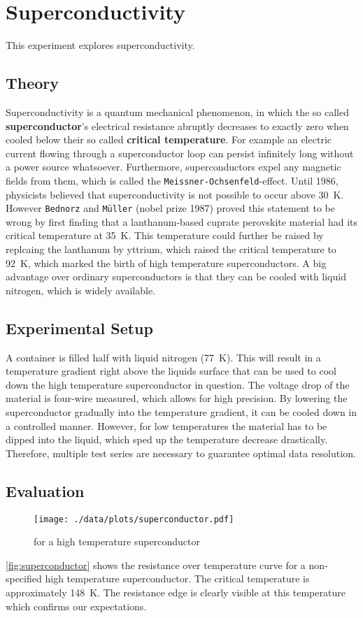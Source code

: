 \chapter{Superconductivity}
This experiment explores superconductivity.

\section{Theory}
Superconductivity is a quantum mechanical phenomenon, in which the so called \textbf{superconductor}'s electrical resistance abruptly decreases to exactly zero when cooled below their so called \textbf{critical temperature}.
For example an electric current flowing through a superconductor loop can persist infinitely long without a power source whatsoever.
Furthermore, superconductors expel any magnetic fields from them, which is called the \texttt{Meissner-Ochsenfeld}-effect.
Until 1986, physicists believed that superconductivity is not possible to occur above \SI{30}{\kelvin}.
However \texttt{Bednorz} and \texttt{Müller} (nobel prize 1987) proved this statement to be wrong by first finding that a lanthanum-based cuprate perovskite material had its critical temperature at \SI{35}{\kelvin}.
This temperature could further be raised by replcaing the lanthanum by yttrium, which raised the critical temperature to \SI{92}{\kelvin}\cite{PhysRevLett.58.908}, which marked the birth of high temperature superconductors.
A big advantage over ordinary superconductors is that they can be cooled with liquid nitrogen, which is widely available.

\section{Experimental Setup}
A container is filled half with liquid nitrogen (\SI{77}{\kelvin}).
This will result in a temperature gradient right above the liquids surface that can be used to cool down the high temperature superconductor in question.
The voltage drop of the material is four-wire measured, which allows for high precision.
By lowering the superconductor gradually into the temperature gradient, it can be cooled down in a controlled manner.
However, for low temperatures the material has to be dipped into the liquid, which sped up the temperature decrease drastically.
Therefore, multiple test series are necessary to guarantee optimal data resolution.

\section{Evaluation}
\begin{figure}[tbp]
	\centering
	\texttt{[image: ./data/plots/superconductor.pdf]}
	\caption[Superconductivity: Resistance over temperature]{ for a high temperature superconductor}
	\label{fig:superconductor}
\end{figure}
\autoref{fig:superconductor} shows the resistance over temperature curve for a non-specified high temperature superconductor.
The critical temperature is approximately \SI{148}{\kelvin}.
The resistance edge is clearly visible at this temperature which confirms our expectations.
